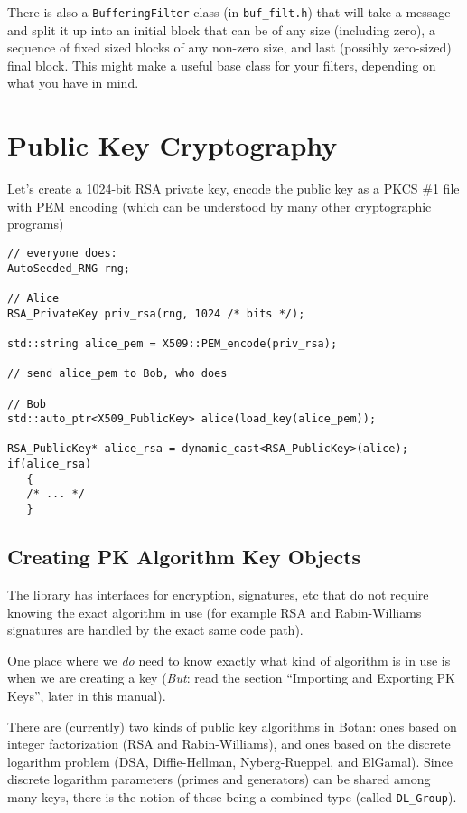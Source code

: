 \documentclass{article}
\newcommand{\filename}[1]{\texttt{#1}}
\newcommand{\type}[1]{\texttt{#1}}
\begin{document}
There is also a \type{BufferingFilter} class (in \filename{buf\_filt.h}) that
will take a message and split it up into an initial block that can be of any
size (including zero), a sequence of fixed sized blocks of any non-zero size,
and last (possibly zero-sized) final block. This might make a useful base class
for your filters, depending on what you have in mind.


\pagebreak
\section{Public Key Cryptography}

Let's create a 1024-bit RSA private key, encode the public key as a
PKCS \#1 file with PEM encoding (which can be understood by many other
cryptographic programs)

\begin{verbatim}
// everyone does:
AutoSeeded_RNG rng;

// Alice
RSA_PrivateKey priv_rsa(rng, 1024 /* bits */);

std::string alice_pem = X509::PEM_encode(priv_rsa);

// send alice_pem to Bob, who does

// Bob
std::auto_ptr<X509_PublicKey> alice(load_key(alice_pem));

RSA_PublicKey* alice_rsa = dynamic_cast<RSA_PublicKey>(alice);
if(alice_rsa)
   {
   /* ... */
   }

\end{verbatim}

\subsection{Creating PK Algorithm Key Objects}

The library has interfaces for encryption, signatures, etc that do not require
knowing the exact algorithm in use (for example RSA and Rabin-Williams
signatures are handled by the exact same code path).

One place where we \emph{do} need to know exactly what kind of algorithm is in
use is when we are creating a key (\emph{But}: read the section ``Importing and
Exporting PK Keys'', later in this manual).

There are (currently) two kinds of public key algorithms in Botan: ones based
on integer factorization (RSA and Rabin-Williams), and ones based on the
discrete logarithm problem (DSA, Diffie-Hellman, Nyberg-Rueppel, and
ElGamal). Since discrete logarithm parameters (primes and generators) can be
shared among many keys, there is the notion of these being a combined type
(called \type{DL\_Group}).
\end{document}
